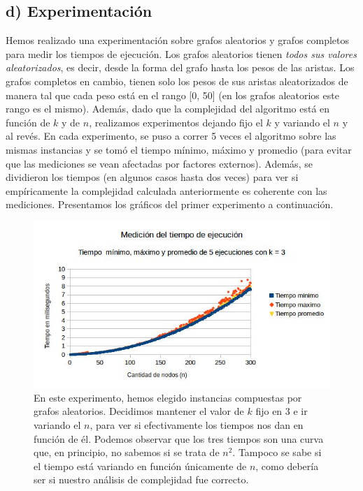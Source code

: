 \documentclass[a4paper]{article}
\begin{document}
\subsection*{d) Experimentación}
Hemos realizado una experimentación sobre grafos aleatorios y grafos completos para medir los tiempos de ejecución. Los grafos aleatorios tienen \textit{todos sus valores aleatorizados}, es decir, desde la forma del grafo hasta los pesos de las aristas. Los grafos completos en cambio, tienen solo los pesos de sus aristas aleatorizados de manera tal que cada peso está en el rango [0, 50] (en los grafos aleatorios este rango es el mismo). Además, dado que la complejidad del algoritmo está en función de $k$ y de $n$, realizamos experimentos dejando fijo el $k$ y variando el $n$ y al revés.
\newline En cada experimento, se puso a correr 5 veces el algoritmo sobre las mismas instancias y se tomó el tiempo mínimo, máximo y promedio (para evitar que las mediciones se vean afectadas por factores externos). Además, se dividieron los tiempos (en algunos casos hasta dos veces) para ver si empíricamente la complejidad calculada anteriormente es coherente con las mediciones.
\newline
\newline Presentamos los gráficos del primer experimento a continuación.
\begin{figure}[h]
\centering
\includegraphics[scale=0.7]{graficostiempohgolosa/tiempokfijo.jpg}\caption{En este experimento, hemos elegido instancias compuestas por grafos aleatorios. Decidimos mantener el valor de $k$ fijo en 3 e ir variando el $n$, para ver si efectivamente los tiempos nos dan en función de él. Podemos observar que los tres tiempos son una curva que, en principio, no sabemos si se trata de $n^2$. Tampoco se sabe si el tiempo está variando en función únicamente de $n$, como debería ser si nuestro análisis de complejidad fue correcto.}
\end{figure}
\end{document}
